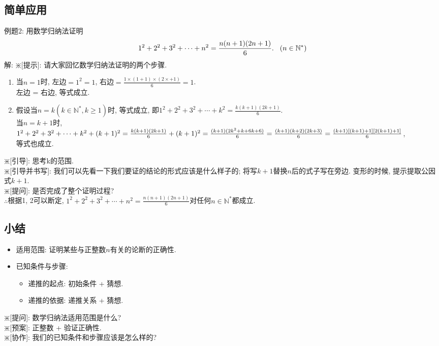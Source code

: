 \documentclass{article}
\begin{document}
\begin{CJK}{UTF8}{gkai}
\subsection{简单应用}
例题2: 用数学归纳法证明
$$1^2 + 2^2 + 3^2 + \cdots + n^2 = \frac{n(n + 1)(2n + 1)}{6}.\hspace{3mm}(n \in \mathbb{N}^*)$$
解: $\divideontimes$[提示]: 请大家回忆数学归纳法证明的两个步骤.\\
\begin{enumerate}[i]
\item 当$n = 1$时, 左边$= 1^2 = 1$, 右边$= \frac{1 \times (1 + 1) \times (2 \times + 1)}{6} = 1$.\\左边 = 右边, 等式成立.
\item 假设当$n = k (k \in \mathbb{N}^*, k \ge 1)$时, 等式成立, 即$1^2 + 2^2 + 3^2 + \cdots + k^2 = \frac{k(k + 1)(2k + 1)}{6}.$
\\当$n = k + 1$时, \\$1^2 + 2^2 + 3^2 + \cdots + k^2 + (k + 1)^2\\= \frac{k(k + 1)(2k + 1)}{6} + (k+1)^2\\= \frac{(k + 1)(2k^2 + k + 6k +6)}{6}\\= \frac{(k + 1)(k + 2)(2k + 3)}{6}\\= \frac{(k + 1)[(k + 1) + 1][2(k + 1) + 1]}{6}$, \\等式也成立.
\end{enumerate}
$\divideontimes$[引导]: 思考k的范围.\\
$\divideontimes$[引导并书写]: 我们可以先看一下我们要证的结论的形式应该是什么样子的; 将写$k + 1$替换$n$后的式子写在旁边. 变形的时候, 提示提取公因式$k + 1$.\\
$\divideontimes$[提问]: 是否完成了整个证明过程?\\
$\therefore$根据1, 2可以断定, $1^2 + 2^2 + 3^2 + \cdots + n^2 = \frac{n(n + 1)(2n + 1)}{6}$对任何$n \in \mathbb{N}^*$都成立.

\subsection{小结}
\begin{itemize}
\item 适用范围: 证明某些与正整数$n$有关的论断的正确性.
\item 已知条件与步骤:
\begin{itemize}
\item 递推的起点: 初始条件 + 猜想.
\item 递推的依据: 递推关系 + 猜想.
\end{itemize}
\end{itemize}
$\divideontimes$[提问]: 数学归纳法适用范围是什么?\\
$\divideontimes$[预案]: 正整数 + 验证正确性. \\
$\divideontimes$[协作]: 我们的已知条件和步骤应该是怎么样的?\\


\end{CJK}
\end{document}
